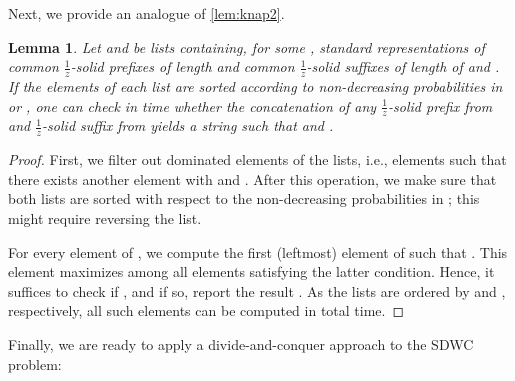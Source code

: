 \documentclass{article}
\theoremstyle{plain}
\newtheorem{lemma}[theorem]{Lemma}
\theoremstyle{definition}
\newcommand{\SDWC}{\textsc{SDWC}\xspace}
\newcommand{\fr}{\ensuremath{\frac1z}}
\newcommand{\mayqed}{}
\begin{document}
 	  Next, we provide an analogue of \cref{lem:knap2}.
      \begin{lemma}\label{lem:meet}
        Let  and  be lists containing, for some , standard representations of common \fr-solid prefixes of length  and
        common \fr-solid suffixes of length  of  and .
        If the elements of each list are sorted according to non-decreasing probabilities in  or ,
        one can check in  time whether the concatenation of any \fr-solid prefix from 
        and \fr-solid suffix from  yields a string  such that  and .
      \end{lemma}
      \begin{proof}
        First, we filter out dominated elements of the lists, i.e., elements  such that there exists
        another element  with  and . 
        After this operation,  we make sure that both lists are sorted with respect to the non-decreasing probabilities in ;
        this might require reversing the list.
        
        
      
        For every element  of , we compute the first (leftmost) element  of 
        such that . This element maximizes  among all elements satisfying the latter condition.
        Hence, it suffices to check if , and if so, report the result .
        As the lists are ordered by  and , respectively, all such elements
        can be computed in  total time.
      \mayqed\end{proof}

      Finally, we are ready to apply a divide-and-conquer approach to the \SDWC problem:
\end{document}
